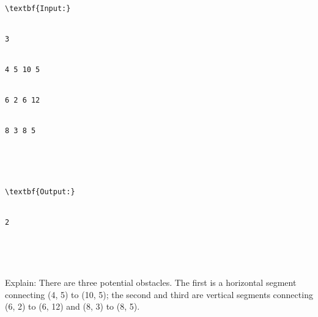 \begin{verbatim}
\textbf{Input:}


3 


4 5 10 5 


6 2 6 12 


8 3 8 5 





\textbf{Output:}


2





\end{verbatim}

   Explain:       There are three potential obstacles. The first is a horizontal segment connecting (4, 5) to (10, 5); the second and third are vertical segments connecting (6, 2) to (6, 12) and (8, 3) to (8, 5).